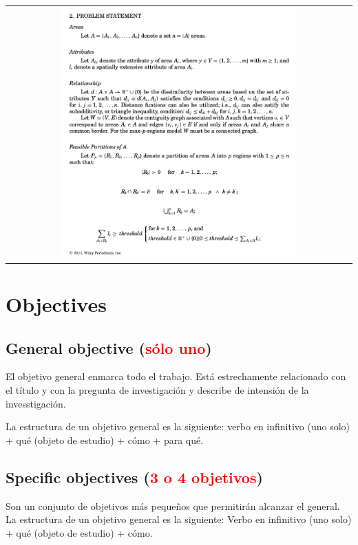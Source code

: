 \documentclass[12pt,letterpaper]{article}
\begin{document}
 \begin{center}
  \begin{tabular}{c}
    \includegraphics[width=0.70\textwidth]{problem_statement}
  \end{tabular}
\end{center}


\section{Objectives}

\subsection{General objective (\textcolor{red}{sólo uno})}

El objetivo general enmarca todo el trabajo. Está estrechamente relacionado con el
título y con la pregunta de investigación y describe de intensión de la
invesstigación.

La estructura de un objetivo general es la siguiente: verbo en infinitivo (uno
solo) + qué (objeto de estudio) + cómo + para qué.


\subsection{Specific objectives (\textcolor{red}{3 o 4 objetivos})}

Son un conjunto de objetivos más pequeños que permitirán alcanzar el general.
La estructura de un objetivo general es la siguiente: Verbo en infinitivo (uno
solo) + qué (objeto de estudio) + cómo.
\end{document}
